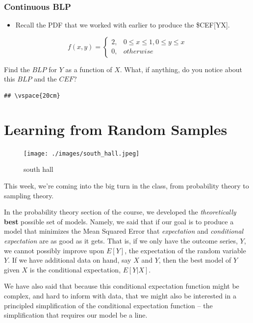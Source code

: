 \documentclass[
]{book}
\providecommand{\tightlist}{%
  \setlength{\itemsep}{0pt}\setlength{\parskip}{0pt}}
\theoremstyle{definition}
\theoremstyle{definition}
\theoremstyle{definition}
\theoremstyle{definition}
\theoremstyle{remark}
\begin{document}
\hypertarget{continuous-blp}{%
\subsection{Continuous BLP}\label{continuous-blp}}

\begin{itemize}
\tightlist
\item
  Recall the PDF that we worked with earlier to produce the \$CEF{[}Y\textbar X{]}.
\end{itemize}

\[
f(x,y) = 
  \begin{cases}
    2, & 0 \leq x \leq 1, 0 \leq y \leq x \\
    0, & otherwise
\end{cases}
\]

Find the \(BLP\) for \(Y\) as a function of \(X\). What, if anything, do you notice about this \(BLP\) and the \(CEF\)?

\begin{verbatim}
## \vspace{20cm}
\end{verbatim}

\hypertarget{learning-from-random-samples}{%
\chapter{Learning from Random Samples}\label{learning-from-random-samples}}

\begin{figure}
\centering
\texttt{[image: ./images/south\_hall.jpeg]}
\caption{south hall}
\end{figure}

This week, we're coming into the big turn in the class, from probability theory to sampling theory.

In the probability theory section of the course, we developed the \emph{theoretically} \textbf{best} possible set of models. Namely, we said that if our goal is to produce a model that minimizes the Mean Squared Error that \emph{expectation} and \emph{conditional expectation} are as good as it gets. That is, if we only have the outcome series, \(Y\), we cannot possibly improve upon \(E[Y]\), the expectation of the random variable \(Y\). If we have additional data on hand, say \(X\) and \(Y\), then the best model of \(Y\) given \(X\) is the conditional expectation, \(E[Y|X]\).

We have also said that because this conditional expectation function might be complex, and hard to inform with data, that we might also be interested in a principled simplification of the conditional expectation function -- the simplification that requires our model be a line.
\end{document}
